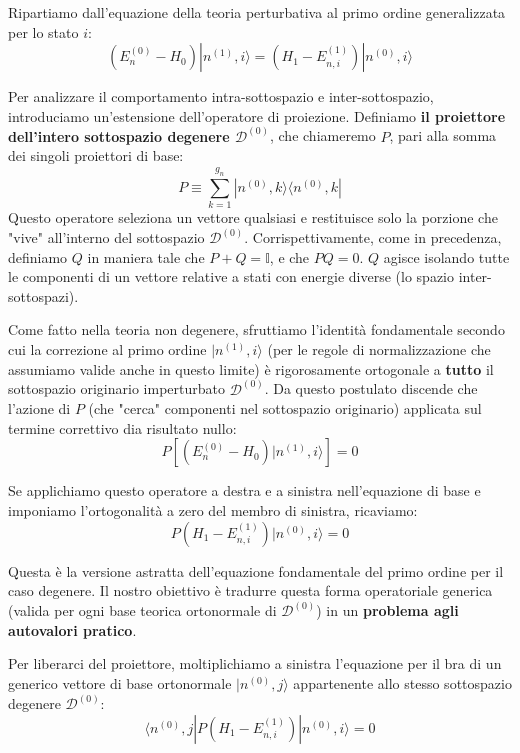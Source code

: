 Ripartiamo dall'equazione della teoria perturbativa al primo ordine generalizzata per lo stato $i$:
\begin{equation}
(E_n^{(0)} - H_0) |n^{(1)}, i\rangle = (H_1 - E_{n,i}^{(1)}) |n^{(0)}, i\rangle
\end{equation}

Per analizzare il comportamento intra-sottospazio e inter-sottospazio, introduciamo un'estensione dell'operatore di proiezione. Definiamo \textbf{il proiettore dell'intero sottospazio degenere $\mathcal{D}^{(0)}$}, che chiameremo $P$, pari alla somma dei singoli proiettori di base:
\begin{equation}
P \equiv \sum_{k=1}^{g_n} |n^{(0)}, k\rangle \langle n^{(0)}, k|
\end{equation}
Questo operatore seleziona un vettore qualsiasi e restituisce solo la porzione che "vive" all'interno del sottospazio $\mathcal{D}^{(0)}$.
Corrispettivamente, come in precedenza, definiamo $Q$ in maniera tale che $P+Q = \mathbb{I}$, e che $PQ = 0$. $Q$ agisce isolando tutte le componenti di un vettore relative a stati con energie diverse (lo spazio inter-sottospazi).

Come fatto nella teoria non degenere, sfruttiamo l'identità fondamentale secondo cui la correzione al primo ordine $\vert{}n^{(1)}, i\rangle$ (per le regole di normalizzazione che assumiamo valide anche in questo limite) è rigorosamente ortogonale a \textbf{tutto} il sottospazio originario imperturbato $\mathcal{D}^{(0)}$.
Da questo postulato discende che l'azione di $P$ (che "cerca" componenti nel sottospazio originario) applicata sul termine correttivo dia risultato nullo:
\begin{equation}
P \left[ (E_n^{(0)} - H_0) |n^{(1)}, i\rangle \right] = 0
\end{equation}

Se applichiamo questo operatore a destra e a sinistra nell'equazione di base e imponiamo l'ortogonalità a zero del membro di sinistra, ricaviamo:
\begin{equation}
P \left( H_1 - E_{n,i}^{(1)} \right) |n^{(0)}, i\rangle = 0
\end{equation}

Questa è la versione astratta dell'equazione fondamentale del primo ordine per il caso degenere. Il nostro obiettivo è tradurre questa forma operatoriale generica (valida per ogni base teorica ortonormale di $\mathcal{D}^{(0)}$) in un \textbf{problema agli autovalori pratico}.

Per liberarci del proiettore, moltiplichiamo a sinistra l'equazione per il bra di un generico vettore di base ortonormale $\vert{}n^{(0)}, j\rangle$ appartenente allo stesso sottospazio degenere $\mathcal{D}^{(0)}$:
\begin{equation}
\langle n^{(0)}, j | P \left( H_1 - E_{n,i}^{(1)} \right) |n^{(0)}, i\rangle = 0
\end{equation}

